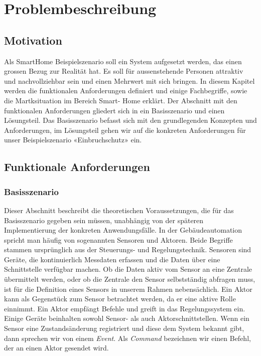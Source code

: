 \section{Problembeschreibung}

\subsection{Motivation}
Als SmartHome Beispielszenario soll ein System aufgesetzt werden, das einen grossen Bezug zur Realität hat. Es soll für aussenstehende Personen attraktiv und nachvollziehbar sein und einen Mehrwert mit sich bringen. In diesem Kapitel werden die funktionalen Anforderungen definiert und einige Fachbegriffe, sowie die Martksituation im Bereich Smart- Home erklärt. Der Abschnitt mit den funktionalen Anforderungen gliedert sich in ein Basisszenario und einen Lösungsteil. Das Basisszenario befasst sich mit den grundlegenden Konzepten und Anforderungen, im Lösungsteil gehen wir auf die konkreten Anforderungen für unser Beispielszenario «Einbruchschutz» ein.


\subsection{Funktionale Anforderungen}
\subsubsection{Basisszenario}
Dieser Abschnitt beschreibt die theoretischen Voraussetzungen, die für das Basisszenario gegeben sein müssen, unabhängig von der späteren Implementierung der konkreten Anwendungsfälle.
In der Gebäudeautomation spricht man häufig von sogenannten Sensoren und Aktoren. Beide Begriffe stammen ursprünglich aus der Steuerungs- und Regelungstechnik. Sensoren sind Geräte, die kontinuierlich Messdaten erfassen und die Daten über eine Schnittstelle verfügbar machen. Ob die Daten aktiv vom Sensor an eine Zentrale übermittelt werden, oder ob die Zentrale den Sensor selbstständig abfragen muss, ist für die Definition eines Sensors in unserem Rahmen nebensächlich. Ein Aktor kann als Gegenstück zum Sensor betrachtet werden, da er eine aktive Rolle einnimmt. Ein Aktor empfängt Befehle und greift in das Regelungssystem ein. Einige Geräte beinhalten sowohl Sensor- als auch Aktorschnittstellen. Wenn ein Sensor eine Zustandsänderung registriert und diese dem System bekannt gibt, dann sprechen wir von einem \textit{Event}. Als \textit{Command} bezeichnen wir einen Befehl, der an einen Aktor gesendet wird.

